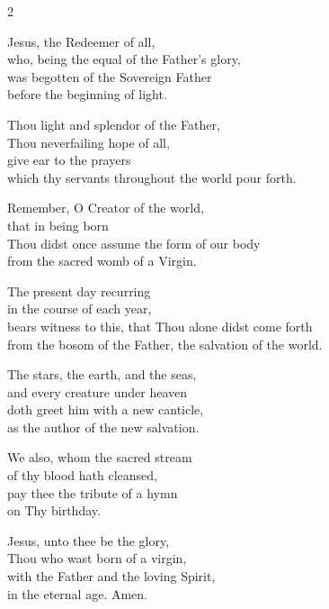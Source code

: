 \begin{multicols}{2}
\begin{enpars}
Jesus, the Redeemer of all,\\
who, being the equal of the Father's glory,\\
was begotten of the Sovereign Father\\
before the beginning of light.

Thou light and splendor of the Father,\\
Thou neverfailing hope of all,\\
give ear to the prayers\\
 which thy servants throughout the world pour forth.
 
Remember, O Creator of the world,\\
that in being born\\
Thou didst once assume the form of our body\\
 from the sacred womb of a Virgin.
 
The present day recurring\\
 in the course of each year,\\
 bears witness to this, that Thou alone didst come forth\\
 from the bosom of the Father, the salvation of the world.
 
The stars, the earth, and the seas,\\
and every creature under heaven\\
doth greet him with a new canticle,\\
as the author of the new salvation.
 
We also, whom the sacred stream\\
 of thy blood hath cleansed,\\pay thee the tribute of a hymn\\
 on Thy birthday.
 
Jesus, unto thee be the glory,\\
 Thou who wast born of a virgin,\\
 with the Father and the loving Spirit,\\
 in the eternal age. Amen.
\end{enpars}
\end{multicols}